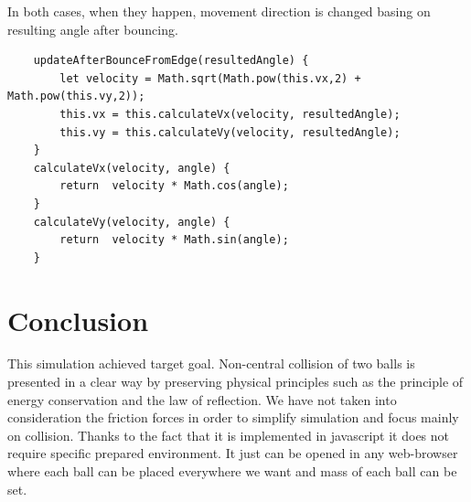 \documentclass[]{report}
\begin{document}
In both cases, when they happen, movement direction is changed basing on resulting angle after bouncing.

\begin{lstlisting}
    updateAfterBounceFromEdge(resultedAngle) {
        let velocity = Math.sqrt(Math.pow(this.vx,2) + Math.pow(this.vy,2));
        this.vx = this.calculateVx(velocity, resultedAngle);
        this.vy = this.calculateVy(velocity, resultedAngle);
    }
    calculateVx(velocity, angle) {
        return  velocity * Math.cos(angle);
    }
    calculateVy(velocity, angle) {
        return  velocity * Math.sin(angle);
    }

\end{lstlisting}
\section{Conclusion}
This simulation achieved target goal. Non-central collision of two balls is presented in a clear way by preserving physical principles such as the principle of energy conservation and the law of reflection. We have not taken into consideration the friction forces in order to simplify simulation and focus mainly on collision. Thanks to the fact that it is implemented in javascript it does not require specific prepared environment. It just can be opened in any web-browser where each ball can be placed everywhere we want and mass of each ball can be set. 
\end{document}
